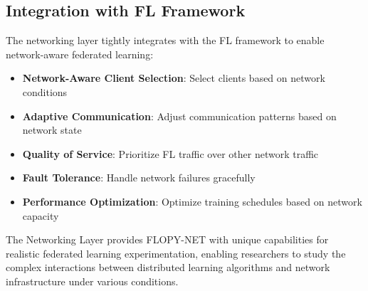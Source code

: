 \subsection{Integration with FL Framework}

The networking layer tightly integrates with the FL framework to enable network-aware federated learning:

\begin{itemize}
    \item \textbf{Network-Aware Client Selection}: Select clients based on network conditions
    \item \textbf{Adaptive Communication}: Adjust communication patterns based on network state
    \item \textbf{Quality of Service}: Prioritize FL traffic over other network traffic
    \item \textbf{Fault Tolerance}: Handle network failures gracefully
    \item \textbf{Performance Optimization}: Optimize training schedules based on network capacity
\end{itemize}

The Networking Layer provides FLOPY-NET with unique capabilities for realistic federated learning experimentation, enabling researchers to study the complex interactions between distributed learning algorithms and network infrastructure under various conditions.
